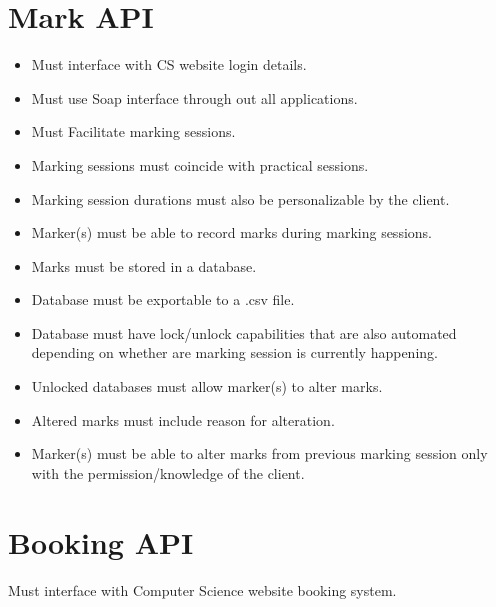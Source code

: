 \documentclass[10pt,a4paper]{article}
\begin{document}
	\section*{Mark API}
	\begin{itemize}
		\item Must interface with CS website login details.
		\item Must use Soap interface through out all applications.
		\item Must Facilitate marking sessions.
		\item Marking sessions must coincide with practical sessions.
		\item Marking session durations must also be personalizable by the client.
		\item Marker(s) must be able to record marks during marking sessions.
		\item Marks must be stored in a database.
		\item Database must be exportable to a .csv file.
		\item Database must have lock/unlock capabilities that are also automated depending on whether are marking session is currently happening.
		\item Unlocked databases must allow marker(s) to alter marks.
		\item Altered marks must include reason for alteration.
		\item Marker(s) must be able to alter marks from previous marking session only with the permission/knowledge of the client.
	\end{itemize}
		
	\section*{Booking API}
	Must interface with Computer Science website booking system. 
                
\end{document}
